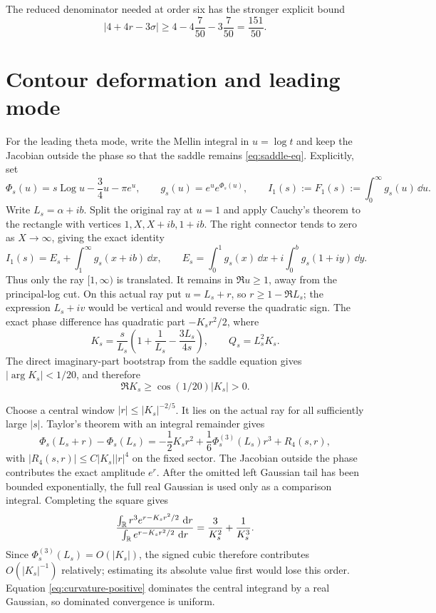 \documentclass[12pt]{article}
\begin{document}
The reduced denominator needed at order six has the stronger explicit bound
\begin{equation}\label{eq:reduced-denominator}
 |4+4r-3\sigma|\ge4-4\frac7{50}-3\frac7{50}=\frac{151}{50}.
\end{equation}

\section{Contour deformation and leading mode}\label{sec:contour}

For the leading theta mode, write the Mellin integral in $u=\log t$ and keep
the Jacobian outside the phase so that the saddle remains
\eqref{eq:saddle-eq}.  Explicitly, set
\[
 \Phi_s(u)=s\operatorname{Log}u-\frac34u-\pi e^u,
 \qquad g_s(u)=e^u e^{\Phi_s(u)},
 \qquad I_1(s):=F_1(s):=\int_0^\infty g_s(u)\,\dd u.
\]
Write $L_s=\alpha+ib$.  Split the original ray at
$u=1$ and apply Cauchy's theorem to the rectangle with vertices
$1,X,X+ib,1+ib$.  The right connector tends to zero as $X\to\infty$, giving
the exact identity
\[
 I_1(s)=E_s+\int_1^\infty g_s(x+ib)\,\dd x,
 \qquad
 E_s=\int_0^1g_s(x)\,\dd x+i\int_0^b g_s(1+iy)\,\dd y.
\]
Thus only the ray $[1,\infty)$ is translated.  It remains in $\Re u\ge1$,
away from the principal-log cut.  On this actual ray put $u=L_s+r$, so
$r\ge1-\Re L_s$; the expression $L_s+iv$ would be vertical and would
reverse the quadratic sign.  The exact phase difference has quadratic part
$-K_sr^2/2$, where
\begin{equation}\label{eq:curvature}
 K_s=\frac{s}{L_s}\left(1+\frac1{L_s}-\frac{3L_s}{4s}\right),
 \qquad Q_s=L_s^2K_s.
\end{equation}
The direct imaginary-part bootstrap from the saddle equation gives
$|\arg K_s|<1/20$, and therefore
\begin{equation}\label{eq:curvature-positive}
 \Re K_s\ge\cos(1/20)|K_s|>0.
\end{equation}

Choose a central window $|r|\le |K_s|^{-2/5}$.  It lies on the actual ray for
all sufficiently large $|s|$.  Taylor's theorem with an integral remainder
gives
\[
 \Phi_s(L_s+r)-\Phi_s(L_s)
 =-\frac12K_sr^2+\frac16\Phi_s^{(3)}(L_s)r^3+R_4(s,r),
\]
with $|R_4(s,r)|\le C|K_s||r|^4$ on the fixed sector.  The Jacobian
outside the phase contributes the exact amplitude $e^r$.  After the omitted
left Gaussian tail has been bounded exponentially, the full real Gaussian is
used only as a comparison integral.  Completing the square gives
\[
 \frac{\int_{\mathbb R}r^3e^{r-K_sr^2/2}\,\,\mathrm d r}
 {\int_{\mathbb R}e^{r-K_sr^2/2}\,\,\mathrm d r}
 =\frac3{K_s^2}+\frac1{K_s^3}.
\]
Since $\Phi_s^{(3)}(L_s)=O(|K_s|)$, the signed cubic therefore contributes
$O(|K_s|^{-1})$ relatively; estimating its absolute value first would lose
this order.  Equation
\eqref{eq:curvature-positive} dominates the central integrand by a real
Gaussian, so dominated convergence is uniform.
\end{document}
